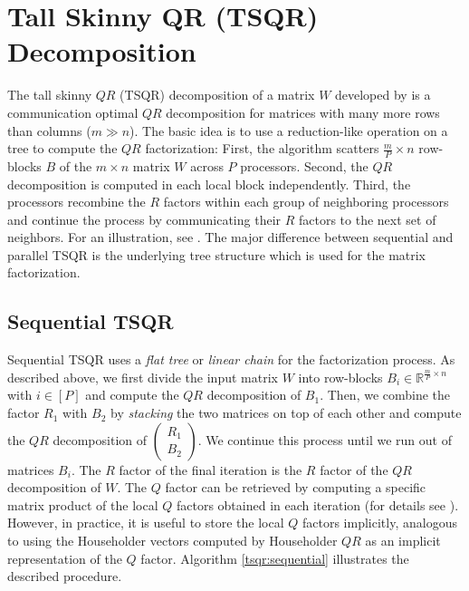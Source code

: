 \documentclass{article}
\begin{document}
\section{Tall Skinny QR (TSQR) Decomposition}

The tall skinny $QR$ (TSQR) decomposition of a matrix $W$ developed by
\citeauthor*{Grigori:2008} \cite{Grigori:2008} is a communication optimal $QR$
decomposition for matrices with many more rows than columns ($m \gg n$). The
basic idea is to use a reduction-like operation on a tree to compute the $QR$
factorization: First, the algorithm scatters $\frac{m}{P} \times n$ row-blocks
$B$ of the $m \times n$ matrix $W$ across $P$ processors. Second, the $QR$
decomposition is computed in each local block independently. Third, the
processors recombine the $R$ factors within each group of neighboring processors
and continue the process by communicating their $R$ factors to the next set of
neighbors. For an illustration, see \cite{Grigori:2008}. The major difference
between sequential and parallel TSQR is the underlying tree structure which is
used for the matrix factorization.

\subsection{Sequential TSQR}

Sequential TSQR uses a \textit{flat tree} or \textit{linear chain} for the
factorization process. As described above, we first divide the input matrix $W$
into row-blocks $B_i \in \mathbb{R}^{\frac{m}{P} \times n}$ with $i \in [P]$ and
compute the $QR$ decomposition of $B_1$. Then, we combine the factor $R_1$ with
$B_2$ by \textit{stacking} the two matrices on top of each other and compute the
$QR$ decomposition of $\left(\begin{smallmatrix} R_1 \\ B_2
\end{smallmatrix}\right)$. We continue this process until we run out of matrices
$B_i$. The $R$ factor of the final iteration is the $R$ factor of the $QR$
decomposition of $W$. The $Q$ factor can be retrieved by computing a specific
matrix product of the local $Q$ factors obtained in each iteration (for details
see \cite{Grigori:2008}). However, in practice, it is useful to store the local
$Q$ factors implicitly, analogous to using the Householder vectors computed by
Householder $QR$ as an implicit representation of the $Q$ factor. Algorithm
\ref{tsqr:sequential} illustrates the described procedure.
\end{document}
